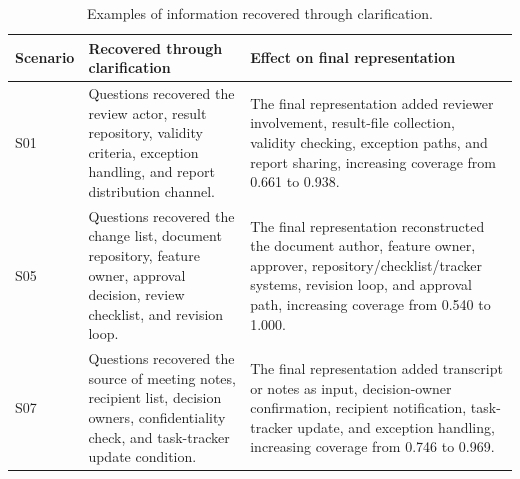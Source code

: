 \begin{table}[H]
\caption{Examples of information recovered through clarification.}
\label{tab:qualitative-improvements}
\centering
\small
\setlength{\tabcolsep}{4pt}
\begin{tabular}{p{}p{}p{}}
\toprule
Scenario & Recovered through clarification & Effect on final representation \\
\midrule
S01 &
Questions recovered the review actor, result repository, validity criteria,
exception handling, and report distribution channel. &
The final representation added reviewer involvement, result-file collection,
validity checking, exception paths, and report sharing, increasing coverage
from 0.661 to 0.938. \\
\midrule
S05 &
Questions recovered the change list, document repository, feature owner,
approval decision, review checklist, and revision loop. &
The final representation reconstructed the document author, feature owner,
approver, repository/checklist/tracker systems, revision loop, and approval
path, increasing coverage from 0.540 to 1.000. \\
\midrule
S07 &
Questions recovered the source of meeting notes, recipient list, decision
owners, confidentiality check, and task-tracker update condition. &
The final representation added transcript or notes as input, decision-owner
confirmation, recipient notification, task-tracker update, and exception
handling, increasing coverage from 0.746 to 0.969. \\
\bottomrule
\end{tabular}
\end{table}
